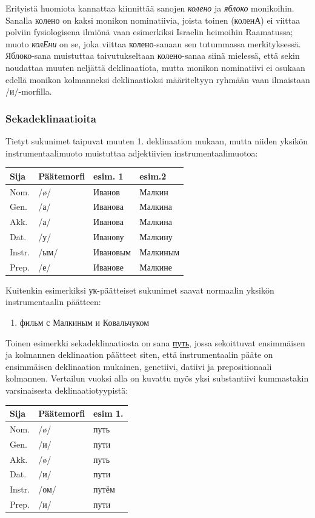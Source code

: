 \documentclass[]{scrartcl}
\providecommand{\tightlist}{%
  \setlength{\itemsep}{0pt}\setlength{\parskip}{0pt}}
\begin{document}
Erityistä huomiota kannattaa kiinnittää sanojen \emph{колено} ja
\emph{яблоко} monikoihin. Sanalla колено on kaksi monikon nominatiivia,
joista toinen (коленА) ei viittaa polviin fysiologisena ilmiönä vaan
esimerkiksi Israelin heimoihin Raamatussa; muoto \emph{колЕни} on se,
joka viittaa колено-sanaan sen tutummassa merkityksessä. Яблоко-sana
muistuttaa taivutukseltaan колено-sanaa siinä mielessä, että sekin
noudattaa muuten neljättä deklinaatiota, mutta monikon nominatiivi ei
osukaan edellä monikon kolmanneksi deklinaatioksi määriteltyyn ryhmään
vaan ilmaistaan /и/-morfilla.

\subsubsection{Sekadeklinaatioita}\label{sekadeklinaatioita}

Tietyt sukunimet taipuvat muuten 1. deklinaation mukaan, mutta niiden
yksikön instrumentaalimuoto muistuttaa adjektiivien
instrumentaalimuotoa:

\begin{longtable}[c]{@{}llll@{}}
\toprule
Sija & Päätemorfi & esim. 1 & esim.2\tabularnewline
\midrule
\endhead
Nom. & /ø/ & Иванов & Малкин\tabularnewline
Gen. & /а/ & Иванова & Малкина\tabularnewline
Akk. & /а/ & Иванова & Малкина\tabularnewline
Dat. & /у/ & Иванову & Малкину\tabularnewline
Instr. & /ым/ & Ивановым & Малкиным\tabularnewline
Prep. & /е/ & Иванове & Малкине\tabularnewline
\bottomrule
\end{longtable}

Kuitenkin esimerkiksi ук-päätteiset sukunimet saavat normaalin yksikön
instrumentaalin päätteen:

\begin{enumerate}
\def\labelenumi{(\arabic{enumi})}
\setcounter{enumi}{3}
\tightlist
\item
  фильм с Малкиным и Ковальчуком
\end{enumerate}

Toinen esimerkki sekadeklinaatiosta on sana
\href{https://ru.wiktionary.org/wiki/путь}{путь}, jossa sekoittuvat
ensimmäisen ja kolmannen deklinaation päätteet siten, että
instrumentaalin pääte on ensimmäisen deklinaation mukainen, genetiivi,
datiivi ja prepositionaali kolmannen. Vertailun vuoksi alla on kuvattu
myös yksi substantiivi kummastakin varsinaisesta deklinaatiotyypistä:

\begin{longtable}[c]{@{}lll@{}}
\toprule
Sija & Päätemorfi & esim 1.\tabularnewline
\midrule
\endhead
Nom. & /ø/ & путь\tabularnewline
Gen. & /и/ & пути\tabularnewline
Akk. & /ø/ & путь\tabularnewline
Dat. & /и/ & пути\tabularnewline
Instr. & /ом/ & путём\tabularnewline
Prep. & /и/ & пути\tabularnewline
\bottomrule
\end{longtable}
\end{document}

